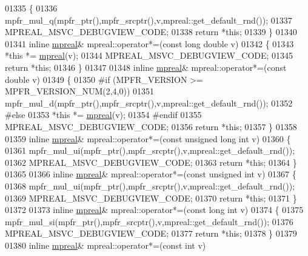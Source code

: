 \begin{DoxyCode}
01335 \{
01336     mpfr\_mul\_q(mpfr\_ptr(),mpfr\_srcptr(),v,mpreal::get\_default\_rnd());
01337     MPREAL\_MSVC\_DEBUGVIEW\_CODE;
01338     \textcolor{keywordflow}{return} *\textcolor{keyword}{this};
01339 \}
01340 
01341 \textcolor{keyword}{inline} \hyperlink{classmpfr_1_1mpreal}{mpreal}& mpreal::operator*=(\textcolor{keyword}{const} \textcolor{keywordtype}{long} \textcolor{keywordtype}{double} v)
01342 \{
01343     *\textcolor{keyword}{this} *= \hyperlink{classmpfr_1_1mpreal}{mpreal}(v);
01344     MPREAL\_MSVC\_DEBUGVIEW\_CODE;
01345     \textcolor{keywordflow}{return} *\textcolor{keyword}{this};
01346 \}
01347 
01348 \textcolor{keyword}{inline} \hyperlink{classmpfr_1_1mpreal}{mpreal}& mpreal::operator*=(\textcolor{keyword}{const} \textcolor{keywordtype}{double} v)
01349 \{
01350 \textcolor{preprocessor}{#if (MPFR\_VERSION >= MPFR\_VERSION\_NUM(2,4,0))}
01351     mpfr\_mul\_d(mpfr\_ptr(),mpfr\_srcptr(),v,mpreal::get\_default\_rnd());
01352 \textcolor{preprocessor}{#else}
01353     *\textcolor{keyword}{this} *= \hyperlink{classmpfr_1_1mpreal}{mpreal}(v);
01354 \textcolor{preprocessor}{#endif}
01355     MPREAL\_MSVC\_DEBUGVIEW\_CODE;
01356     \textcolor{keywordflow}{return} *\textcolor{keyword}{this};
01357 \}
01358 
01359 \textcolor{keyword}{inline} \hyperlink{classmpfr_1_1mpreal}{mpreal}& mpreal::operator*=(\textcolor{keyword}{const} \textcolor{keywordtype}{unsigned} \textcolor{keywordtype}{long} \textcolor{keywordtype}{int} v)
01360 \{
01361     mpfr\_mul\_ui(mpfr\_ptr(),mpfr\_srcptr(),v,mpreal::get\_default\_rnd());
01362     MPREAL\_MSVC\_DEBUGVIEW\_CODE;
01363     \textcolor{keywordflow}{return} *\textcolor{keyword}{this};
01364 \}
01365 
01366 \textcolor{keyword}{inline} \hyperlink{classmpfr_1_1mpreal}{mpreal}& mpreal::operator*=(\textcolor{keyword}{const} \textcolor{keywordtype}{unsigned} \textcolor{keywordtype}{int} v)
01367 \{
01368     mpfr\_mul\_ui(mpfr\_ptr(),mpfr\_srcptr(),v,mpreal::get\_default\_rnd());
01369     MPREAL\_MSVC\_DEBUGVIEW\_CODE;
01370     \textcolor{keywordflow}{return} *\textcolor{keyword}{this};
01371 \}
01372 
01373 \textcolor{keyword}{inline} \hyperlink{classmpfr_1_1mpreal}{mpreal}& mpreal::operator*=(\textcolor{keyword}{const} \textcolor{keywordtype}{long} \textcolor{keywordtype}{int} v)
01374 \{
01375     mpfr\_mul\_si(mpfr\_ptr(),mpfr\_srcptr(),v,mpreal::get\_default\_rnd());
01376     MPREAL\_MSVC\_DEBUGVIEW\_CODE;
01377     \textcolor{keywordflow}{return} *\textcolor{keyword}{this};
01378 \}
01379 
01380 \textcolor{keyword}{inline} \hyperlink{classmpfr_1_1mpreal}{mpreal}& mpreal::operator*=(\textcolor{keyword}{const} \textcolor{keywordtype}{int} v)

\end{DoxyCode}
